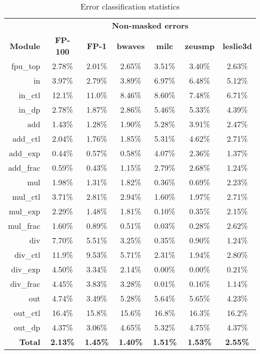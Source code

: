 \documentclass[12pt]{yalephd}
\begin{document}
\begin{table}[!ht]
\caption{Error classification statistics}\label{sC3tFaultActivation}
\tabcolsep 4.5pt
\begin{center}
\begin{threeparttable}[b]
\begin{tabular}{||r|c|c|c|c|c|c||}
\hline
\hline

 & \multicolumn{6}{|c||}{\bf Non-masked errors} \\

{\bf Module} &{\bf FP-100} & {\bf FP-1} & {\bf {bwaves}} & {\bf milc} & {\bf zeusmp} & {\bf leslie3d}\\
\hline
\hline
          fpu\_top &    2.78\% &  2.01\%      & 2.65\% & 3.51\% & 3.40\% & 2.63\%\\
\hline
               in &      3.97\% &     2.79\%  & 3.89\% & 6.97\% & 6.48\% & 5.12\%\\
           in\_ctl &      12.1\% &     11.0\% & 8.46\% & 8.60\% & 7.48\% & 6.71\%\\
            in\_dp &   2.78\% &    1.87\%     & 2.86\% & 5.46\% & 5.33\% & 4.39\%\\
\hline
              add &     1.43\% &     1.28\%   & 1.90\% & 5.28\% & 3.91\% & 2.47\%\\
          add\_ctl &    2.04\% &     1.76\%   & 1.85\% & 5.31\% & 4.62\% & 2.71\%\\
       add\_exp &    0.44\% &    0.57\%       & 0.58\% & 4.07\% & 2.36\% & 1.37\%\\
      add\_frac &    0.59\% &    0.43\%       & 1.15\% & 2.79\% & 2.68\% & 1.24\%\\
\hline
              mul &     1.98\% &     1.31\%   & 1.82\% & 0.36\% & 0.69\% & 2.23\%\\
          mul\_ctl &     3.71\% &     2.81\%  & 2.94\% & 1.60\% & 1.97\% & 2.71\%\\
       mul\_exp &     2.29\% &    1.48\%      & 1.81\% & 0.10\% & 0.35\% & 2.15\%\\
      mul\_frac &   1.60\% &   0.89\%         & 0.51\% & 0.03\% & 0.28\% & 2.62\%\\
\hline
              div &     7.70\% &    5.51\%    & 3.25\% & 0.35\% & 0.90\% & 1.24\%\\
          div\_ctl &     11.9\% &    9.53\%   & 5.71\% & 2.31\% & 1.94\% & 2.80\%\\
       div\_exp &    4.50\% &     3.34\%      & 2.14\% & 0.00\% & 0.00\% & 0.21\%\\
      div\_frac &    4.45\% &    3.83\%       & 3.28\% & 0.01\% & 0.16\% & 1.14\%\\
\hline
              out &    4.74\% &     3.49\%    & 5.28\% & 5.64\% & 5.65\% & 4.23\%\\
          out\_ctl &      16.4\% &     15.8\% & 15.6\% & 16.8\% & 16.3\% & 16.2\%\\
           out\_dp &     4.37\% &     3.06\%  & 4.65\% & 5.32\% & 4.75\% & 4.37\% \\
\hline
\hline
            {\bf Total} &  {\bf 2.13\%} & {\bf 1.45\%}  & {\bf 1.40\%} & {\bf 1.51\%} & {\bf 1.53\%} & {\bf 2.55\%}\\


\end{tabular}
\end{threeparttable}
\end{center}
\end{table}
\end{document}
